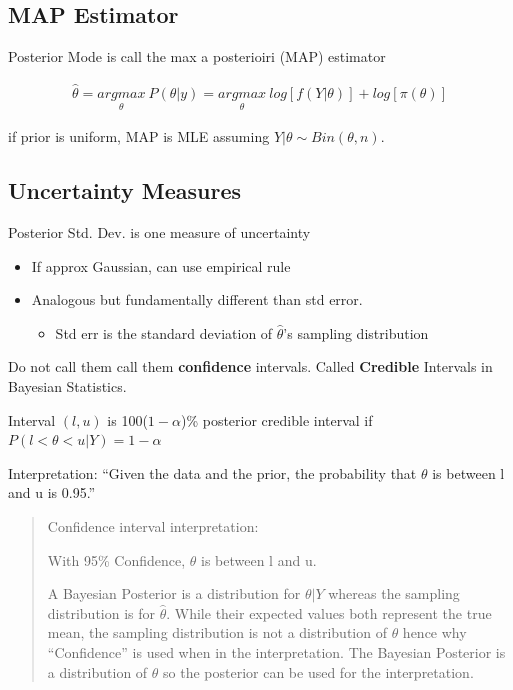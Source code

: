 \documentclass[11pt]{article}
\begin{document}
\subsection{MAP Estimator}
\label{sec:orga417478}

Posterior Mode is call the max a posterioiri (MAP) estimator

\begin{equation}
\begin{split}
\hat \theta = \underset{\theta}{argmax} \ P (\theta | y) = \underset{\theta}{argmax} \ log[f(Y | \theta)] + log[\pi(\theta)]
\end{split}
\end{equation}

if prior is uniform, MAP is MLE assuming \(Y | \theta \sim Bin(\theta, n)\).

\subsection{Uncertainty Measures}
\label{sec:org6dad758}

Posterior Std. Dev. is one measure of uncertainty
\begin{itemize}
\item If approx Gaussian, can use empirical rule
\item Analogous but fundamentally different than std error.
\begin{itemize}
\item Std err is the standard deviation of \(\hat \theta\)'s sampling distribution
\end{itemize}
\end{itemize}

Do not call them call them \textbf{confidence} intervals. Called \textbf{Credible} Intervals
in Bayesian Statistics.

Interval \((l, u)\) is 100(\(1 - \alpha\))\% posterior credible interval if \(P(l < \theta < u | Y) = 1 - \alpha\)

Interpretation: ``Given the data and the prior, the probability that \(\theta\) is
between l and u is 0.95.''

\begin{quote}
Confidence interval interpretation:

With 95\% Confidence, \(\theta\) is between l and u.

A Bayesian Posterior is a distribution for \(\theta | Y\) whereas the sampling
distribution is for \(\hat \theta\). While their expected values both represent
the true mean, the sampling distribution is not a distribution of \(\theta\) hence why ``Confidence'' is used when in the interpretation. The Bayesian Posterior is a distribution of \(\theta\) so the posterior can be used for the interpretation.
\end{quote}
\end{document}
